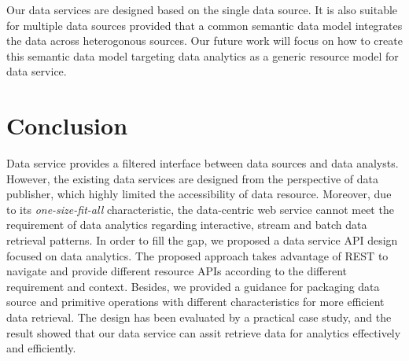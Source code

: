 \documentclass[10pt, conference, compsocconf]{IEEEtran}
\begin{document}
Our data services are designed based on the single data source. It is also suitable for multiple data sources provided that a common semantic data model integrates the data across heterogonous sources.  Our future work will focus on how to create this semantic data model targeting data analytics as a generic resource model for data service. 

\section{Conclusion}
Data service provides a filtered interface between data sources and data analysts. However, the existing data services are designed from the perspective of data publisher, which highly limited the accessibility of data resource. Moreover, due to its \textit{one-size-fit-all} characteristic, the data-centric web service cannot meet the requirement of data analytics regarding interactive, stream and batch data retrieval patterns. In order to fill the gap, we proposed a data service API design focused on data analytics. The proposed approach takes advantage of REST to navigate and provide different resource APIs according to the different requirement and context. Besides, we provided a guidance for packaging data source and primitive operations with different characteristics for more efficient data retrieval. The design has been evaluated by a practical case study, and the result showed that our data service can assit retrieve data for analytics effectively and efficiently.




\vspace{-0.2cm}






\end{document}

